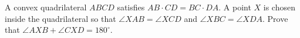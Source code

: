A convex quadrilateral $ABCD$ satisfies $AB \cdot CD = BC \cdot DA$. A point $X$ is chosen inside the quadrilateral so that $\angle XAB = \angle XCD$ and $\angle XBC = \angle XDA$. Prove that $\angle AXB + \angle CXD = 180^\circ$.